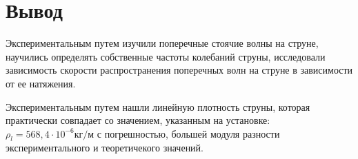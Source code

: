 \documentclass[a4paper, 12pt]{article} %
\begin{document}
\section{Вывод}

Экспериментальным путем изучили поперечные стоячие волны на струне, научились определять собственные частоты колебаний струны, исследовали зависимость скорости распространения поперечных волн на струне в зависимости от ее натяжения. 

Экспериментальным путем нашли линейную плотность струны, которая практически совпадает со значением, указанным на установке: $\rho_l = 568,4 \cdot 10^{-6} \text{кг/м}$ с погрешностью, большей модуля разности экспериментального и теоретичекого значений.
\end{document}
